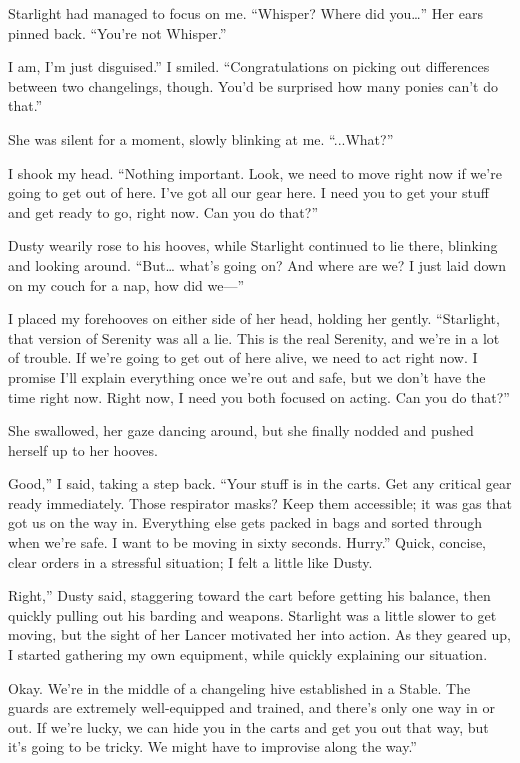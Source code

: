 Starlight had managed to focus on me. “Whisper? Where did you…” Her ears pinned back. “You’re not Whisper.”

\leavevmode{}I am, I’m just disguised.” I smiled. “Congratulations on picking out differences between two changelings, though. You’d be surprised how many ponies can’t do that.”

She was silent for a moment, slowly blinking at me. “...What?”

I shook my head. “Nothing important. Look, we need to move right now if we’re going to get out of here. I’ve got all our gear here. I need you to get your stuff and get ready to go, right now. Can you do that?”

Dusty wearily rose to his hooves, while Starlight continued to lie there, blinking and looking around. “But… what’s going on? And where are we? I just laid down on my couch for a nap, how did we—”

I placed my forehooves on either side of her head, holding her gently. “Starlight, that version of Serenity was all a lie. This is the real Serenity, and we’re in a lot of trouble. If we’re going to get out of here alive, we need to act right now. I promise I’ll explain everything once we’re out and safe, but we don’t have the time right now. Right now, I need you both focused on acting. Can you do that?”

She swallowed, her gaze dancing around, but she finally nodded and pushed herself up to her hooves.

\leavevmode{}Good,” I said, taking a step back. “Your stuff is in the carts. Get any critical gear ready immediately. Those respirator masks? Keep them accessible; it was gas that got us on the way in. Everything else gets packed in bags and sorted through when we’re safe. I want to be moving in sixty seconds. Hurry.” Quick, concise, clear orders in a stressful situation; I felt a little like Dusty.

\leavevmode{}Right,” Dusty said, staggering toward the cart before getting his balance, then quickly pulling out his barding and weapons. Starlight was a little slower to get moving, but the sight of her Lancer motivated her into action. As they geared up, I started gathering my own equipment, while quickly explaining our situation.

\leavevmode{}Okay. We’re in the middle of a changeling hive established in a Stable. The guards are extremely well-equipped and trained, and there’s only one way in or out. If we’re lucky, we can hide you in the carts and get you out that way, but it’s going to be tricky. We might have to improvise along the way.”

